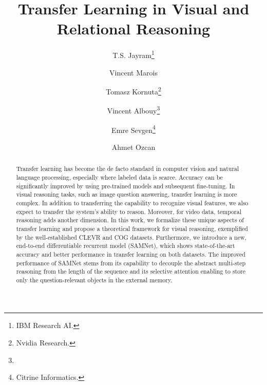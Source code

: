 \documentclass[10pt,twocolumn,letterpaper]{article}
\theoremstyle{remark}
\begin{document}
\title{Transfer Learning in Visual and Relational Reasoning}

\author{%
	T.S. Jayram\thanks{IBM Research AI.} \and
	Vincent Marois\footnotemark[2] \and
	Tomasz Kornuta\thanks{Nvidia Research.} \and
	Vincent Albouy\thanks{} \and
	Emre Sevgen\thanks{Citrine Informatics.}  \and
	Ahmet Ozcan\footnotemark[2]
}
%

\maketitle

\begin{abstract}
Transfer learning has become the de facto standard in computer vision and natural language processing, especially where labeled data is scarce. Accuracy can be significantly improved by using pre-trained models and subsequent fine-tuning. In visual reasoning tasks, such as image question answering, transfer learning is more complex. In addition to transferring the capability to recognize visual features, we also expect to transfer the system’s ability to reason. Moreover, for video data, temporal reasoning adds another dimension. In this work, we formalize these unique aspects of transfer learning and propose a theoretical framework for visual reasoning, exemplified by the well-established CLEVR and COG datasets. Furthermore, we introduce a new, end-to-end differentiable recurrent model (SAMNet), which shows state-of-the-art accuracy and better performance in transfer learning on both datasets. The improved performance of SAMNet stems from its capability to decouple the abstract multi-step reasoning from the length of the sequence and its selective attention enabling to store only the question-relevant objects in the external memory.
\end{abstract}













\clearpage
{\small


}

%
\end{document}
